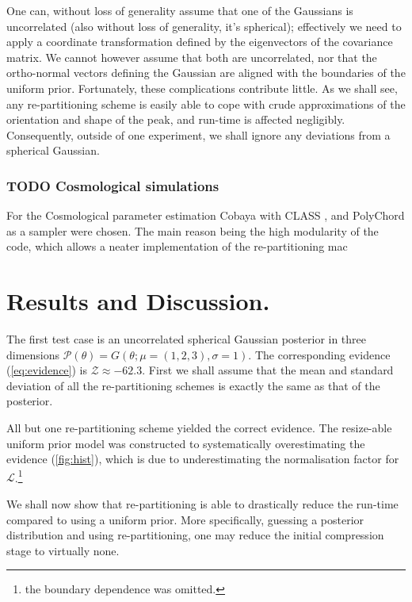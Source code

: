 \documentclass[usenatbib]{mnras}
\begin{document}
One can, without loss of generality assume that one of the
Gaussians is uncorrelated (also without loss of generality, it's
spherical); effectively we need to apply a coordinate
transformation defined by the eigenvectors of the covariance
matrix. We cannot however assume that both are uncorrelated, nor
that the ortho-normal vectors defining the Gaussian are aligned
with the boundaries of the uniform prior. Fortunately, these
complications contribute little. As we shall see, any
re-partitioning scheme is easily able to cope with crude
approximations of the orientation and shape of the peak, and
run-time is affected negligibly. Consequently, outside of one
experiment, we shall ignore any deviations from a spherical
Gaussian.





\subsubsection{{\bfseries\sffamily TODO} Cosmological simulations}
\label{sec:orgd585eb2}
For the Cosmological parameter estimation Cobaya \citep{cobaya} with
CLASS \citep{Blas_2011}, and PolyChord \citep{polychord} as a sampler
were chosen. The main reason being the high modularity of the code,
which allows a neater implementation of the re-partitioning
mac
\section{Results and Discussion.}
\label{sec:org2aa4e77}
The first test case is an uncorrelated spherical Gaussian posterior
in three dimensions \(\mathcal{P}(\theta) = G(\theta; \mu = (1,2,3),
  \sigma = 1)\). The corresponding evidence (\autoref{eq:evidence}) is
\(\mathcal{Z}\approx-62.3\). First we shall assume that the mean and
standard deviation of all the re-partitioning schemes is exactly the
same as that of the posterior. 

All but one re-partitioning scheme yielded the correct
evidence. The resize-able uniform prior model was constructed to
systematically overestimating the evidence (\autoref{fig:hist}),
which is due to underestimating the normalisation factor for
\(\mathcal{L}\).\footnote{the boundary dependence was omitted.}


We shall now show that re-partitioning is able to drastically reduce
the run-time compared to using a uniform prior. More specifically,
guessing a posterior distribution and using re-partitioning, one may
reduce the initial compression stage to virtually none.
\end{document}
